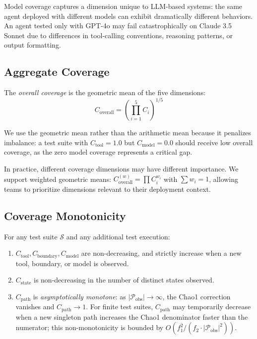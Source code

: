 Model coverage captures a dimension unique to LLM-based systems: the
same agent deployed with different models can exhibit dramatically
different behaviors. An agent tested only with GPT-4o may fail
catastrophically on Claude 3.5 Sonnet due to differences in tool-calling
conventions, reasoning patterns, or output formatting.

\subsection{Aggregate Coverage}
\label{sec:coverage:aggregate}

\begin{definition}
\label{def:overall-coverage}
The \emph{overall coverage} is the geometric mean of the five dimensions:
\begin{equation}
\label{eq:overall-coverage}
  C_{\text{overall}} = \left( \prod_{i=1}^{5} C_i \right)^{1/5}
\end{equation}
\end{definition}

We use the geometric mean rather than the arithmetic mean because it
penalizes imbalance: a test suite with $C_{\text{tool}} = 1.0$ but
$C_{\text{model}} = 0.0$ should receive low overall coverage, as the
zero model coverage represents a critical gap.

\begin{remark}
In practice, different coverage dimensions may have different importance.
We support weighted geometric means:
$C_{\text{overall}}^{(w)} = \prod C_i^{w_i}$ with
$\sum w_i = 1$, allowing teams to prioritize dimensions relevant to
their deployment context.
\end{remark}

\subsection{Coverage Monotonicity}
\label{sec:coverage:monotonicity}

\begin{theorem}
\label{thm:coverage-mono}
For any test suite $\mathcal{S}$ and any additional test execution:
\begin{enumerate}[leftmargin=*]
  \item $C_{\text{tool}}, C_{\text{boundary}}, C_{\text{model}}$ are
    non-decreasing, and strictly increase when a new tool, boundary,
    or model is observed.
  \item $C_{\text{state}}$ is non-decreasing in the number of distinct
    states observed.
  \item $C_{\text{path}}$ is \emph{asymptotically monotone}: as
    $|\mathcal{P}_{\text{obs}}| \to \infty$, the Chao1 correction
    vanishes and $C_{\text{path}} \to 1$. For finite test suites,
    $C_{\text{path}}$ may temporarily decrease when a new singleton
    path increases the Chao1 denominator faster than the numerator;
    this non-monotonicity is bounded by
    $O(f_1^2 / (f_2 \cdot |\mathcal{P}_{\text{obs}}|^2))$.
\end{enumerate}
\end{theorem}

